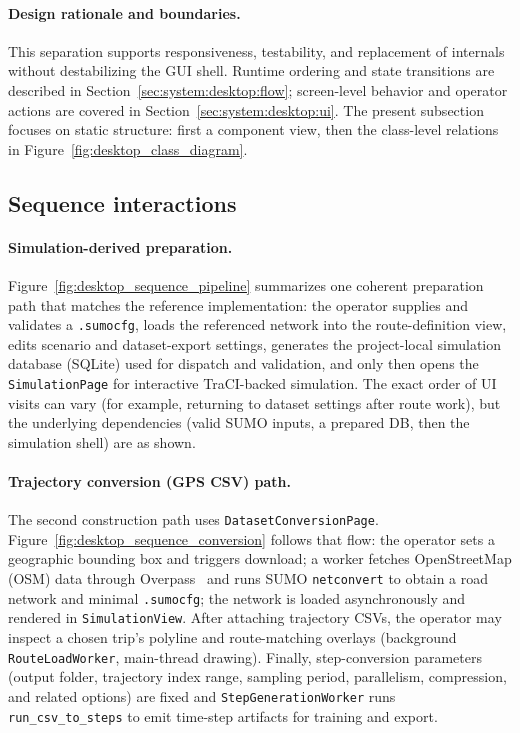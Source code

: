 \paragraph{Design rationale and boundaries.}
This separation supports responsiveness, testability, and replacement of internals without destabilizing the GUI shell. Runtime ordering and state transitions are described in Section~\ref{sec:system:desktop:flow}; screen-level behavior and operator actions are covered in Section~\ref{sec:system:desktop:ui}. The present subsection focuses on static structure: first a component view, then the class-level relations in Figure~\ref{fig:desktop_class_diagram}.

\subsection{Sequence interactions}\label{sec:system:desktop:sequence}

\paragraph{Simulation-derived preparation.}
\begin{sloppypar}
Figure~\ref{fig:desktop_sequence_pipeline} summarizes one coherent preparation path that matches the reference implementation: the operator supplies and validates a \texttt{.sumocfg}, loads the referenced network into the route-definition view, edits scenario and dataset-export settings, generates the project-local simulation database (SQLite) used for dispatch and validation, and only then opens the \texttt{SimulationPage} for interactive TraCI-backed simulation. The exact order of UI visits can vary (for example, returning to dataset settings after route work), but the underlying dependencies (valid SUMO inputs, a prepared DB, then the simulation shell) are as shown.
\end{sloppypar}



\paragraph{Trajectory conversion (GPS CSV) path.}
\begin{sloppypar}
The second construction path uses \texttt{DatasetConversionPage}. Figure~\ref{fig:desktop_sequence_conversion} follows that flow: the operator sets a geographic bounding box and triggers download; a worker fetches OpenStreetMap (OSM) data through Overpass~\cite{osm} and runs SUMO \texttt{netconvert} to obtain a road network and minimal \texttt{.sumocfg}; the network is loaded asynchronously and rendered in \texttt{SimulationView}. After attaching trajectory CSVs, the operator may inspect a chosen trip's polyline and route-matching overlays (background \texttt{RouteLoadWorker}, main-thread drawing). Finally, step-conversion parameters (output folder, trajectory index range, sampling period, parallelism, compression, and related options) are fixed and \texttt{StepGenerationWorker} runs \texttt{run\_csv\_to\_steps} to emit time-step artifacts for training and export.
\end{sloppypar}

